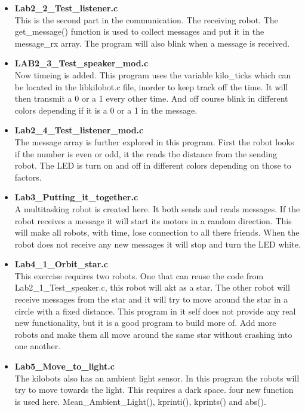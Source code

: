 \begin{itemize}
\item \textbf{Lab2\_2\_Test\_listener.c}\\
This is the second part in the communication. The receiving robot. The get\_message() function is used to collect messages and put it in the message\_rx array. The program will also blink when a message is received.

\item \textbf{LAB2\_3\_Test\_speaker\_mod.c}\\
Now timeing is added. This program uses the variable kilo\_ticks which can be located in the libkilobot.c file, inorder to keep track off the time. It will then transmit a 0 or a 1 every other time. And off course blink in different colors depending if it is a 0 or a 1 in the message.

\item \textbf{Lab2\_4\_Test\_listener\_mod.c}\\
The message array is further explored in this program. First the robot looks if the number is even or odd, it the reads the distance from the sending robot. The LED is turn on and off in different colors depending on those to factors.

\item \textbf{Lab3\_Putting\_it\_together.c}\\
A multitasking robot is created here. It both sends and reads messages. If the robot receives a message it will start its motors in a random direction. This will make all robots, with time, lose connection to all there friends. When the robot does not receive any new messages it will stop and turn the LED white.

\item \textbf{Lab4\_1\_Orbit\_star.c}\\%
This exercise requires two robots. One that can reuse the code from\\
 Lab2\_1\_Test\_speaker.c, this robot will akt as a star. The other robot will receive messages from the star and it will try to move around the star in a circle with a fixed distance. This program in it self does not provide any real new functionality, but it is a good program to build more of. Add more robots and make them all move around the same star without crashing into one another.

\item \textbf{Lab5\_Move\_to\_light.c}\\
The kilobots also has an ambient light sensor. In this program the robots will try to move towards the light. This requires a dark space.
four new function is used here. Mean\_Ambient\_Light(), kprinti(), kprints() and abs().


\end{itemize}
